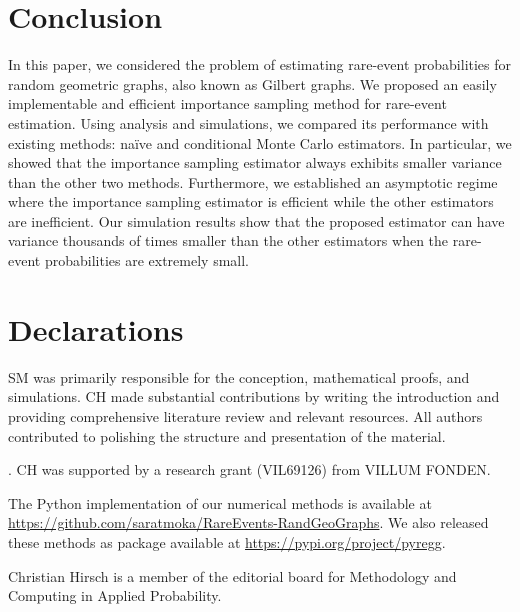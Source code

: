 \documentclass[pdflatex, sn-mathphys-ay]{sn-jnl}%
\theoremstyle{thmstyleone}%
\theoremstyle{thmstyletwo}%
\theoremstyle{thmstylethree}%
\begin{document}
\section{Conclusion}
\label{sec:conclusion}
In this paper, we considered the problem of estimating rare-event probabilities for random geometric graphs, also known as Gilbert graphs. We proposed an easily implementable and efficient importance sampling method for rare-event estimation. Using analysis and simulations, we compared its performance with existing methods: na\"{i}ve and conditional Monte Carlo estimators.  In particular, we showed that the importance sampling estimator always exhibits smaller variance than the other two methods. Furthermore, we established an asymptotic regime where the importance sampling estimator is efficient while the other estimators are inefficient. Our simulation results show that the proposed estimator can have variance thousands of times smaller than the other estimators when the rare-event probabilities are extremely small. 
\medskip

\section*{Declarations}
 SM was primarily responsible for the conception, mathematical proofs, and simulations. CH made substantial contributions by writing the introduction and providing comprehensive literature review and relevant resources. All authors contributed to polishing the structure and presentation of the material.
\medskip

. CH was supported by a research grant (VIL69126) from VILLUM FONDEN.
\medskip

 The Python implementation of our numerical methods is available at \url{https://github.com/saratmoka/RareEvents-RandGeoGraphs}. We also released these methods as package available at \url{https://pypi.org/project/pyregg}.
\medskip

Christian Hirsch is a member of the editorial board for Methodology and Computing in Applied Probability.
\end{document}
